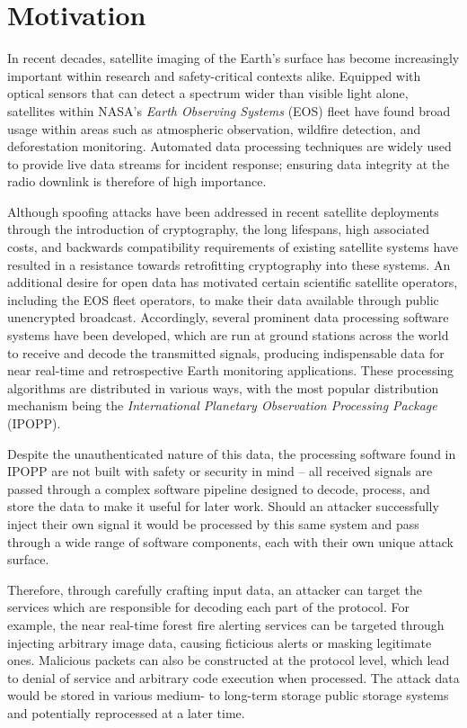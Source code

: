 \section{Motivation}


In recent decades, satellite imaging of the Earth's surface has become increasingly important within research and safety-critical contexts alike. 
Equipped with optical sensors that can detect a spectrum wider than visible light alone, satellites within NASA's \textit{Earth Observing Systems} (EOS) fleet have found broad usage within areas such as atmospheric observation, wildfire detection, and deforestation monitoring.
Automated data processing techniques are widely used to provide live data streams for incident response; ensuring data integrity at the radio downlink is therefore of high importance.

Although spoofing attacks have been addressed in recent satellite deployments through the introduction of cryptography, the long lifespans, high associated costs, and backwards compatibility requirements of existing satellite systems have resulted in a resistance towards retrofitting cryptography into these systems.
An additional desire for open data has motivated certain scientific satellite operators, including the EOS fleet operators, to make their data available through public unencrypted broadcast.
Accordingly, several prominent data processing software systems have been developed, which are run at ground stations across the world to receive and decode the transmitted signals, producing indispensable data for near real-time and retrospective Earth monitoring applications.
These processing algorithms are distributed in various ways, with the most popular distribution mechanism being the \textit{International Planetary Observation Processing Package} (IPOPP).

Despite the unauthenticated nature of this data, the processing software found in IPOPP are not built with safety or security in mind -- all received signals are passed through a complex software pipeline designed to decode, process, and store the data to make it useful for later work.
Should an attacker successfully inject their own signal it would be processed by this same system and pass through a wide range of software components, each with their own unique attack surface.

Therefore, through carefully crafting input data, an attacker can target the services which are responsible for decoding each part of the protocol.
For example, the near real-time forest fire alerting services can be targeted through injecting arbitrary image data, causing ficticious alerts or masking legitimate ones.
Malicious packets can also be constructed at the protocol level, which lead to denial of service and arbitrary code execution when processed.
The attack data would be stored in various medium- to long-term storage public storage systems and potentially reprocessed at a later time.


